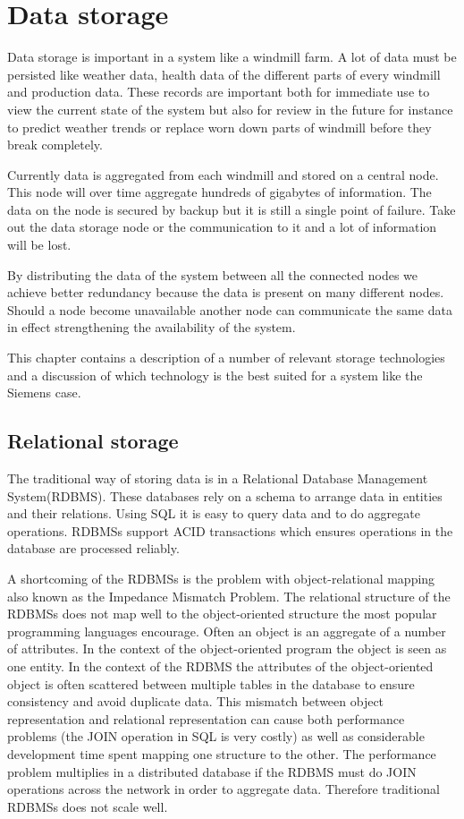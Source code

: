 \chapter{Data storage}
Data storage is important in a system like a windmill farm.
A lot of data must be persisted like weather data, health data of the different parts of every windmill and production data.
These records are important both for immediate use to view the current state of the system but also for review in the future for instance to predict weather trends or replace worn down parts of windmill before they break completely.

Currently data is aggregated from each windmill and stored on a central node.
This node will over time aggregate hundreds of gigabytes of information.
The data on the node is secured by backup but it is still a single point of failure.
Take out the data storage node or the communication to it and a lot of information will be lost.

By distributing the data of the system between all the connected nodes we achieve better redundancy because the data is present on many different nodes.
Should a node become unavailable another node can communicate the same data in effect strengthening the availability of the system.

This chapter contains a description of a number of relevant storage technologies and a discussion of which technology is the best suited for a system like the Siemens case.

\section{Relational storage}
The traditional way of storing data is in a Relational Database Management System(RDBMS).
These databases rely on a schema to arrange data in entities and their relations.
Using SQL it is easy to query data and to do aggregate operations.
RDBMSs support ACID transactions which ensures operations in the database are processed reliably.

A shortcoming of the RDBMSs is the problem with object-relational mapping also known as the Impedance Mismatch Problem\cite{Fowler:IntroNoSQL, Neward:TheVietnamOfComputerScience}.
The relational structure of the RDBMSs does not map well to the object-oriented structure the most popular programming languages encourage.
Often an object is an aggregate of a number of attributes.
In the context of the object-oriented program the object is seen as one entity.
In the context of the RDBMS the attributes of the object-oriented object is often scattered between multiple tables in the database to ensure consistency and avoid duplicate data.
This mismatch between object representation and relational representation can cause both performance problems (the JOIN operation in SQL is very costly) as well as considerable development time spent mapping one structure to the other.
The performance problem multiplies in a distributed database if the RDBMS must do JOIN operations across the network in order to aggregate data.
Therefore traditional RDBMSs does not scale well.

